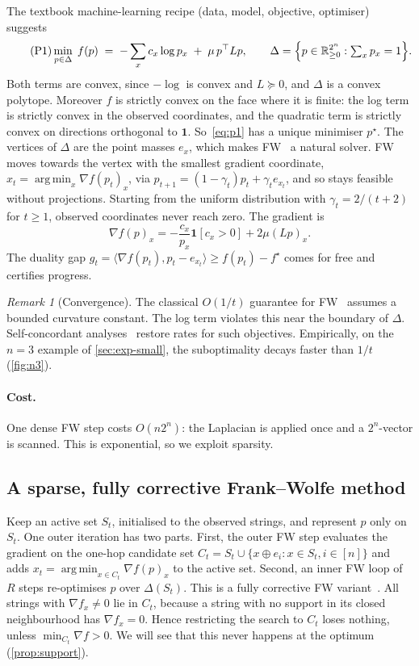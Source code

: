 \documentclass[11pt]{article}
\theoremstyle{definition}
\theoremstyle{remark}
\newtheorem{remark}[theorem]{Remark}
\newcommand{\R}{\mathbb{R}}
\newcommand{\simplex}{\Delta}
\newcommand{\one}{\mathbf{1}}
\DeclareMathOperator*{\argmin}{arg\,min}
\begin{document}
The textbook machine-learning recipe (data, model, objective, optimiser) suggests
\begin{equation}\tag{P1}\label{eq:p1}
\min_{p\in\simplex}\; f(p) \;=\; -\sum_{x} c_x\log p_x \;+\; \mu\,p^\top L p,
\qquad \simplex=\Bigl\{p\in\R^{2^n}_{\ge0}:\textstyle\sum_x p_x=1\Bigr\}.
\end{equation}
Both terms are convex, since $-\log$ is convex and $L\succeq0$, and $\simplex$ is a convex polytope. Moreover $f$ is strictly convex on the face where it is finite: the log term is strictly convex in the observed coordinates, and the quadratic term is strictly convex on directions orthogonal to $\mathbf{1}$. So~\eqref{eq:p1} has a unique minimiser $p^\star$. The vertices of $\simplex$ are the point masses $e_x$, which makes FW~\cite{frank1956algorithm,jaggi2013revisiting} a natural solver. FW moves towards the vertex with the smallest gradient coordinate, $x_t=\argmin_x\nabla f(p_t)_x$, via $p_{t+1}=(1-\gamma_t)p_t+\gamma_t e_{x_t}$, and so stays feasible without projections. Starting from the uniform distribution with $\gamma_t=2/(t+2)$ for $t\ge1$, observed coordinates never reach zero. The gradient is
\[
\nabla f(p)_x=-\frac{c_x}{p_x}\one[c_x>0]+2\mu (Lp)_x .
\]
The duality gap $g_t=\langle\nabla f(p_t),p_t-e_{x_t}\rangle\ge f(p_t)-f^\star$ comes for free and certifies progress.

\begin{remark}[Convergence]
The classical $O(1/t)$ guarantee for FW~\cite{jaggi2013revisiting} assumes a bounded curvature constant. The log term violates this near the boundary of $\simplex$. Self-concordant analyses~\cite{dvurechensky2020selfconcordant} restore rates for such objectives. Empirically, on the $n=3$ example of \cref{sec:exp-small}, the suboptimality decays faster than $1/t$ (\cref{fig:n3}).
\end{remark}

\paragraph{Cost.}
One dense FW step costs $O(n2^n)$: the Laplacian is applied once and a $2^n$-vector is scanned. This is exponential, so we exploit sparsity.

\subsection{A sparse, fully corrective Frank--Wolfe method}

Keep an active set $S_t$, initialised to the observed strings, and represent $p$ only on $S_t$. One outer iteration has two parts. First, the outer FW step evaluates the gradient on the one-hop candidate set $C_t=S_t\cup\{x\oplus e_i:x\in S_t, i\in[n]\}$ and adds $x_t=\argmin_{x\in C_t}\nabla f(p)_x$ to the active set. Second, an inner FW loop of $R$ steps re-optimises $p$ over $\simplex(S_t)$. This is a fully corrective FW variant~\cite{holloway1974extension,lacoste2015global}. All strings with $\nabla f_x\neq 0$ lie in $C_t$, because a string with no support in its closed neighbourhood has $\nabla f_x=0$. Hence restricting the search to $C_t$ loses nothing, unless $\min_{C_t}\nabla f>0$. We will see that this never happens at the optimum (\cref{prop:support}).
\end{document}
